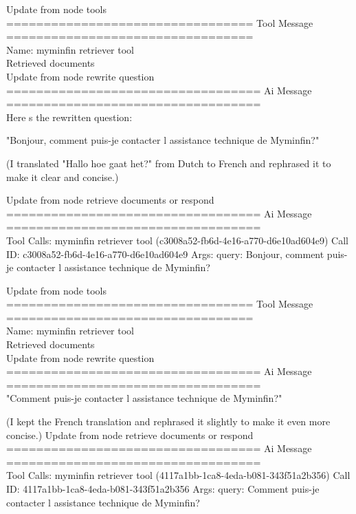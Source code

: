 Update from node tools
\\[1em]
================================= Tool Message =================================
\\[1em]
Name: myminfin retriever tool
\\[1em]
Retrieved documents
\\[1em]

Update from node rewrite question
\\[1em]
================================== Ai Message ==================================
\\[1em]
Here s the rewritten question:

"Bonjour, comment puis-je contacter l assistance technique de Myminfin?" 

(I translated "Hallo hoe gaat het?" from Dutch to French and rephrased it to make it clear and concise.)

Update from node retrieve documents or respond
\\[1em]
================================== Ai Message ==================================
\\[1em]
Tool Calls:
myminfin retriever tool (c3008a52-fb6d-4e16-a770-d6e10ad604e9)
Call ID: c3008a52-fb6d-4e16-a770-d6e10ad604e9
Args:
query: Bonjour, comment puis-je contacter l assistance technique de Myminfin?

Update from node tools
\\[1em]
================================= Tool Message =================================
\\[1em]
Name: myminfin retriever tool
\\[1em]
Retrieved documents
\\[1em]

Update from node rewrite question
\\[1em]
================================== Ai Message ==================================
\\[1em]

"Comment puis-je contacter l assistance technique de Myminfin?" 

(I kept the French translation and rephrased it slightly to make it even more concise.)
Update from node retrieve documents or respond
\\[1em]
================================== Ai Message ==================================
\\[1em]
Tool Calls:
myminfin retriever tool (4117a1bb-1ca8-4eda-b081-343f51a2b356)
Call ID: 4117a1bb-1ca8-4eda-b081-343f51a2b356
Args:
query: Comment puis-je contacter l assistance technique de Myminfin?



